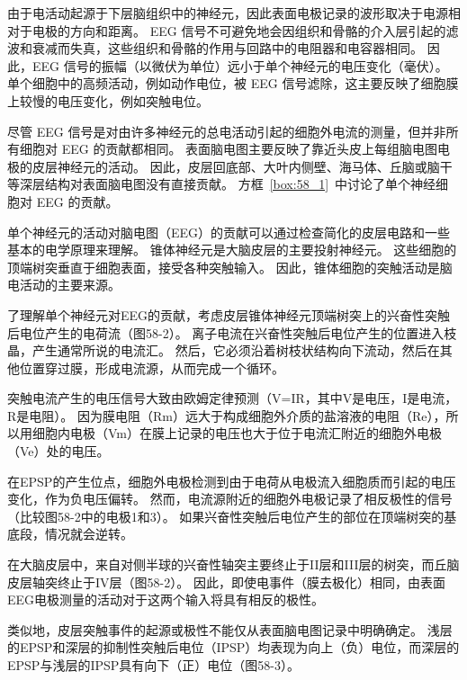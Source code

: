 由于电活动起源于下层脑组织中的神经元，因此表面电极记录的波形取决于电源相对于电极的方向和距离。
EEG 信号不可避免地会因组织和骨骼的介入层引起的滤波和衰减而失真，这些组织和骨骼的作用与回路中的电阻器和电容器相同。
因此，EEG 信号的振幅（以微伏为单位）远小于单个神经元的电压变化（毫伏）。
单个细胞中的高频活动，例如动作电位，被 EEG 信号滤除，这主要反映了细胞膜上较慢的电压变化，例如突触电位。


尽管 EEG 信号是对由许多神经元的总电活动引起的细胞外电流的测量，但并非所有细胞对 EEG 的贡献都相同。
表面脑电图主要反映了靠近头皮上每组脑电图电极的皮层神经元的活动。
因此，皮层回底部、大叶内侧壁、海马体、丘脑或脑干等深层结构对表面脑电图没有直接贡献。
方框~\ref{box:58_1}~中讨论了单个神经细胞对 EEG 的贡献。


\begin{proposition}[单个神经元对脑电图的贡献] \label{box:58_1}
	
	\quad \quad 单个神经元的活动对脑电图（EEG）的贡献可以通过检查简化的皮层电路和一些基本的电学原理来理解。
	锥体神经元是大脑皮层的主要投射神经元。
	这些细胞的顶端树突垂直于细胞表面，接受各种突触输入。
	因此，锥体细胞的突触活动是脑电活动的主要来源。
	
	了理解单个神经元对EEG的贡献，考虑皮层锥体神经元顶端树突上的兴奋性突触后电位产生的电荷流（图58-2）。
	离子电流在兴奋性突触后电位产生的位置进入枝晶，产生通常所说的电流汇。
	然后，它必须沿着树枝状结构向下流动，然后在其他位置穿过膜，形成电流源，从而完成一个循环。
	
	突触电流产生的电压信号大致由欧姆定律预测（V=IR，其中V是电压，I是电流，R是电阻）。
	因为膜电阻（Rm）远大于构成细胞外介质的盐溶液的电阻（Re），所以用细胞内电极（Vm）在膜上记录的电压也大于位于电流汇附近的细胞外电极（Ve）处的电压。
	
	在EPSP的产生位点，细胞外电极检测到由于电荷从电极流入细胞质而引起的电压变化，作为负电压偏转。
	然而，电流源附近的细胞外电极记录了相反极性的信号（比较图58-2中的电极1和3）。
	如果兴奋性突触后电位产生的部位在顶端树突的基底段，情况就会逆转。
	
	在大脑皮层中，来自对侧半球的兴奋性轴突主要终止于II层和III层的树突，而丘脑皮层轴突终止于IV层（图58-2）。
	因此，即使电事件（膜去极化）相同，由表面EEG电极测量的活动对于这两个输入将具有相反的极性。
	
	类似地，皮层突触事件的起源或极性不能仅从表面脑电图记录中明确确定。
	浅层的EPSP和深层的抑制性突触后电位（IPSP）均表现为向上（负）电位，而深层的EPSP与浅层的IPSP具有向下（正）电位（图58-3）。
	
\end{proposition}


